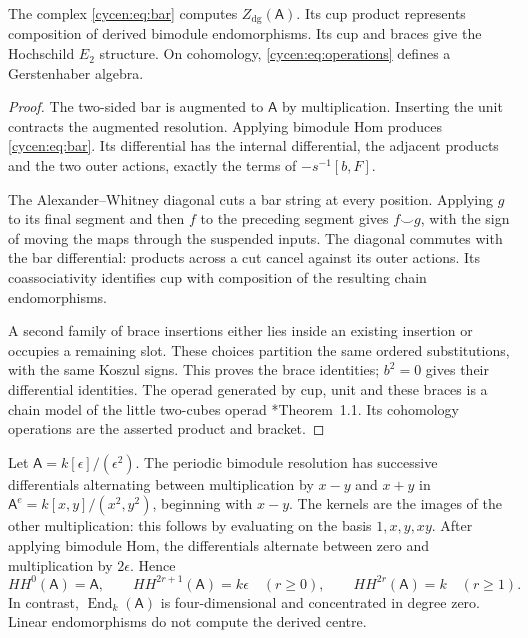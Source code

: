 \begin{proposition}\label{cycen:prop:bar-operations}
The complex \eqref{cycen:eq:bar} computes
$Z_{\mathrm{dg}}(\mathsf A)$. Its cup product represents
composition of derived bimodule endomorphisms. Its cup and
braces give the Hochschild $E_2$ structure. On cohomology,
\eqref{cycen:eq:operations} defines a Gerstenhaber algebra.
\end{proposition}
\begin{proof}
The two-sided bar is augmented to $\mathsf A$ by multiplication.
Inserting the unit contracts the augmented resolution. Applying
bimodule Hom produces \eqref{cycen:eq:bar}. Its differential
has the internal differential, the adjacent products and the
two outer actions, exactly the terms of $-s^{-1}[b,F]$.

The Alexander--Whitney diagonal cuts a bar string at every
position. Applying $g$ to its final segment and then $f$ to
the preceding segment gives $f\smile g$, with the sign of
moving the maps through the suspended inputs. The diagonal
commutes with the bar differential: products across a cut
cancel against its outer actions. Its coassociativity identifies
cup with composition of the resulting chain endomorphisms.

A second family of brace insertions either lies inside an
existing insertion or occupies a remaining slot. These choices
partition the same ordered substitutions, with the same Koszul
signs. This proves the brace identities; $b^2=0$ gives their
differential identities. The operad generated by cup, unit and
these braces is a chain model of the little two-cubes operad
\cite{McClureSmith}*{Theorem~1.1}. Its cohomology operations
are the asserted product and bracket.
\end{proof}

\begin{example}\label{cycen:ex:dual-numbers}
Let $\mathsf A=k[\epsilon]/(\epsilon^2)$. The periodic
bimodule resolution has successive differentials alternating
between multiplication by $x-y$ and $x+y$ in
$\mathsf A^e=k[x,y]/(x^2,y^2)$, beginning with $x-y$.
The kernels are the images of the other multiplication:
this follows by evaluating on the basis $1,x,y,xy$.
After applying bimodule Hom, the differentials alternate
between zero and multiplication by $2\epsilon$. Hence
\[
 HH^0(\mathsf A)=\mathsf A,\qquad
 HH^{2r+1}(\mathsf A)=k\epsilon\quad(r\geq0),\qquad
 HH^{2r}(\mathsf A)=k\quad(r\geq1).
\]
In contrast, $\operatorname{End}_k(\mathsf A)$ is
four-dimensional and concentrated in degree zero. Linear
endomorphisms do not compute the derived centre.
\end{example}


